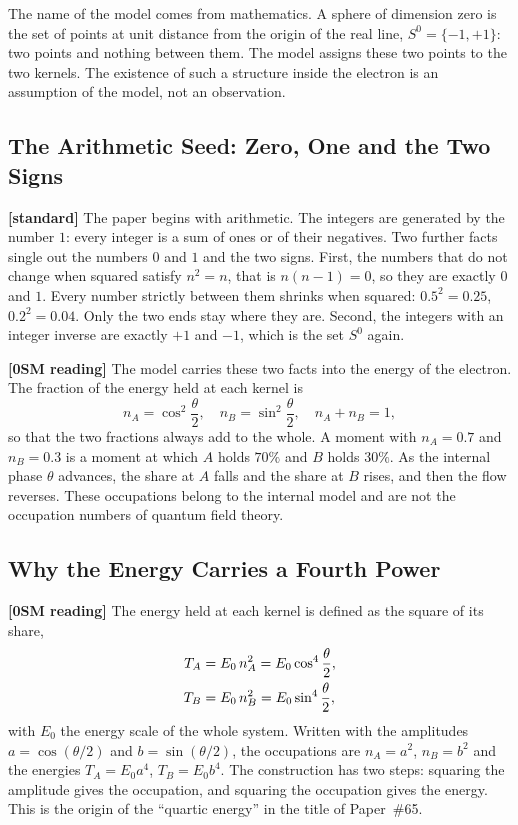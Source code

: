 \documentclass[%
 reprint, amsmath,amssymb, aps, prb, ]{revtex4-2}
\numberwithin{equation}{section}
\newcommand{\iphase}{\theta}
\begin{document}
The name of the model comes from mathematics. A sphere of dimension zero is the set of points at unit distance from the origin of the real line, $S^{0} = \{-1,+1\}$: two points and nothing between them. The model assigns these two points to the two kernels. The existence of such a structure inside the electron is an assumption of the model, not an observation.

\subsection{The Arithmetic Seed: Zero, One and the Two Signs}
\label{subsec:g_seed}

\textbf{[standard]} The paper begins with arithmetic. The integers are generated by the number $1$: every integer is a sum of ones or of their negatives. Two further facts single out the numbers $0$ and $1$ and the two signs. First, the numbers that do not change when squared satisfy $n^{2} = n$, that is $n(n-1) = 0$, so they are exactly $0$ and $1$. Every number strictly between them shrinks when squared: $0.5^{2} = 0.25$, $0.2^{2} = 0.04$. Only the two ends stay where they are. Second, the integers with an integer inverse are exactly $+1$ and $-1$, which is the set $S^{0}$ again.

\textbf{[0SM reading]} The model carries these two facts into the energy of the electron. The fraction of the energy held at each kernel is
\begin{equation}
n_A = \cos^{2}\frac{\iphase}{2}, \quad n_B = \sin^{2}\frac{\iphase}{2}, \quad n_A + n_B = 1,
\label{eq:g_occ}
\end{equation}
so that the two fractions always add to the whole. A moment with $n_A = 0.7$ and $n_B = 0.3$ is a moment at which $A$ holds $70\%$ and $B$ holds $30\%$. As the internal phase $\iphase$ advances, the share at $A$ falls and the share at $B$ rises, and then the flow reverses. These occupations belong to the internal model and are not the occupation numbers of quantum field theory.

\subsection{Why the Energy Carries a Fourth Power}
\label{subsec:g_quartic}

\textbf{[0SM reading]} The energy held at each kernel is defined as the square of its share,
\begin{align}
T_A &= E_0\,n_A^{2} = E_0\cos^{4}\frac{\iphase}{2},
\notag\\
T_B &= E_0\,n_B^{2} = E_0\sin^{4}\frac{\iphase}{2},
\label{eq:g_TATB}
\end{align}
with $E_0$ the energy scale of the whole system. Written with the amplitudes $a = \cos(\iphase/2)$ and $b = \sin(\iphase/2)$, the occupations are $n_A = a^{2}$, $n_B = b^{2}$ and the energies $T_A = E_0 a^{4}$, $T_B = E_0 b^{4}$. The construction has two steps: squaring the amplitude gives the occupation, and squaring the occupation gives the energy. This is the origin of the ``quartic energy'' in the title of Paper~\#65.
\end{document}
